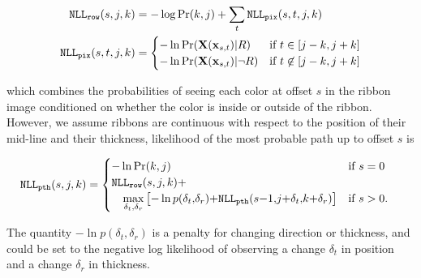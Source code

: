 \begin{align}
\mathtt{NLL_{row}}(s, j, k) &= -\log \Pr(k, j)  + \sum_{t} \mathtt{NLL_{pix}}(s,t, j, k) \\
\mathtt{NLL_{pix}}(s, t, j, k) &= 
\begin{cases}
 -\ln\Pr(\mathbf{X}(\mathbf{x}_{s,t})|R) &\text{if } t\in [j-k, j+k]\\
 -\ln\Pr(\mathbf{X}(\mathbf{x}_{s,t})|\neg R) &\text{if } t\not\in[j-k, j+k]
\end{cases}
\end{align}

which combines the probabilities of seeing each color at offset $s$ in the ribbon image conditioned on whether the color is inside or outside of the ribbon.
However, we assume ribbons are continuous with respect to the position of their mid-line and their thickness, likelihood of the most probable path up to offset $s$ is 

\begin{align}
\mathtt{NLL_{pth}}(s, j, k) &=  \begin{cases}
-\ln \Pr(k, j) & \text{if } s = 0\\
   \mathtt{NLL_{row}}(s, j, k){+} \\
   \hspace{1em}\displaystyle\max_{\delta_t,\delta_r} 
   \left[
   -\ln p(\delta_t{,}\delta_r){+}
   \mathtt{NLL_{pth}}(s{-}1{,}j{+}\delta_t{,}k{+}\delta_r)
 \right]
 & \text{if } s > 0.\\
\end{cases}
\end{align}

The quantity $-\ln p(\delta_t, \delta_r)$ is a penalty for changing direction or thickness, and could be set to the negative log likelihood of observing a change $\delta_t$ in position and a change $\delta_r$ in thickness. 




